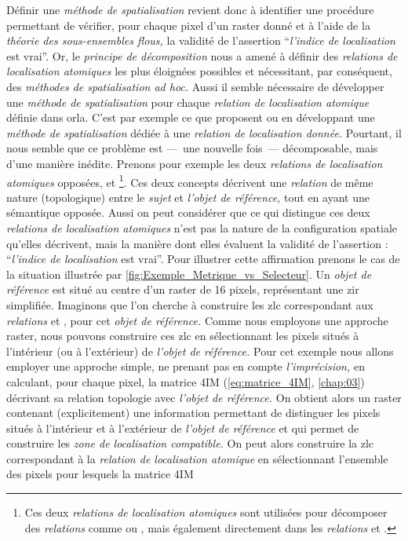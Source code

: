 Définir une \emph{méthode de spatialisation} revient donc à identifier une procédure permettant de vérifier, pour chaque pixel d'un raster donné et à l'aide de la \emph{théorie des sous-ensembles flous,} la validité de l'assertion \enquote{\emph{l'indice de localisation} est vrai}. Or, le \emph{principe de décomposition} nous a amené à définir des \emph{relations de localisation atomiques} les plus éloignées possibles et nécessitant, par conséquent, des \emph{méthodes de spatialisation ad hoc.} Aussi il semble nécessaire de développer une \emph{méthode de spatialisation} pour chaque \emph{relation de localisation atomique} définie dans \ac{orla}. C'est par exemple ce que proposent \textcite{Vanegas2011} ou \textcite{Takemura2012} en développant une \emph{méthode de spatialisation} dédiée à une \emph{relation de localisation donnée.} Pourtant, il nous semble que ce problème est ---~une nouvelle fois~--- décomposable, mais d'une manière inédite. Prenons pour exemple les deux \emph{relations de localisation atomiques} opposées,  et  \footnote{Ces deux \emph{relations de localisation atomiques} sont utilisées pour décomposer des \emph{relations} comme \protect{} ou \protect{}, mais également directement dans les \emph{relations} \protect{} et \protect{}.}. Ces deux concepts décrivent une \emph{relation} de même nature (\ie topologique) entre le \emph{sujet} et \emph{l'objet de référence,} tout en ayant une sémantique opposée. Aussi on peut considérer que ce qui distingue ces deux \emph{relations de localisation atomiques} n'est pas la nature de la configuration spatiale qu'elles décrivent, mais la manière dont elles évaluent la validité de l'assertion : \enquote{\emph{l'indice de localisation} est vrai}. Pour illustrer cette affirmation prenons le cas de la situation illustrée par \autoref{fig:Exemple_Metrique_vs_Selecteur}. Un \emph{objet de référence} est situé au centre d'un raster de 16 pixels, représentant une \ac{zir} simplifiée. Imaginons que l'on cherche à construire les \ac{zlc} correspondant aux \emph{relations}  et , pour cet \emph{objet de référence.} Comme nous employons une approche raster, nous pouvons construire ces \ac{zlc} en sélectionnant les pixels situés à l'intérieur (ou à l'extérieur) de \emph{l'objet de référence.} Pour cet exemple nous allons employer une approche simple, ne prenant pas en compte \emph{l'imprécision,} en calculant, pour chaque pixel, la matrice 4IM (\autoref{eq:matrice_4IM}, \autoref{chap:03}) décrivant sa relation topologie avec \emph{l'objet de référence.} On obtient alors un raster contenant (explicitement) une information permettant de distinguer les pixels situés à l'intérieur et à l'extérieur de \emph{l'objet de référence} et qui permet de construire les \emph{zone de localisation compatible.} On peut alors construire la \ac{zlc} correspondant à la \emph{relation de localisation atomique}  en sélectionnant l'ensemble des pixels pour lesquels la matrice 4IM 
